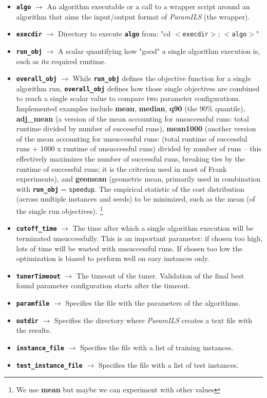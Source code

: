 \begin{itemize}
	\item \textbf{\texttt{algo}} $\rightarrow$ An algorithm executable or a call to a wrapper script around an algorithm that aims the input/output format of \textit{ParamILS} (the wrapper).
	\item \textbf{\texttt{execdir}} $\rightarrow$ Directory to execute \textbf{\texttt{algo}} from: "cd $<$\texttt{execdir}$>$; $<$\texttt{algo}$>$" 
	\item \textbf{\texttt{run\_obj}} $\rightarrow$ A scalar quantifying how "good" a single algorithm execution is, such as its required runtime.
	\item \textbf{\texttt{overall\_obj}} $\rightarrow$ While \textbf{\texttt{run\_obj}} defines the objective function for a single algorithm run, \textbf{\texttt{overall\_obj}} defines how those single objectives are combined to reach a single scalar value to compare two parameter configurations. Implemented examples include {\bf mean}, {\bf median}, {\bf q90} (the 90\% quantile), {\bf adj\_mean} (a version of the mean accounting for unsuccessful runs: total runtime divided by number of successful runs), {\bf mean1000} (another version of the mean accounting for unsuccessful runs: (total runtime of successful runs + 1000 x runtime of unsuccessful runs) divided by number of runs -- this effectively maximizes the number of successful runs, breaking ties by the runtime of successful runs; it is the criterion used in most of Frank experiments), and {\bf geomean} (geometric mean, primarily used in combination with \textbf{\texttt{run\_obj}} = \texttt{speedup}. The empirical statistic of the cost distribution (across multiple instances and seeds) to be minimized, such as the mean (of the single run objectives). \footnote{We use {\bf mean} but maybe we can experiment with other values}
	\item \textbf{\texttt{cutoff\_time}} $\rightarrow$ The time after which a single algorithm execution will be terminated unsuccessfully. This is an important parameter: if chosen too high, lots of time will be wasted with unsuccessful runs. If chosen too low the optimization is biased to perform well on easy instances only.
	\item \textbf{\texttt{tunerTimeout}} $\rightarrow$ The timeout of the tuner. Validation of the final best found parameter configuration starts after the timeout.
	\item \textbf{\texttt{paramfile}} $\rightarrow$ Specifies the file with the parameters of the algorithms. 
	\item \textbf{\texttt{outdir}} $\rightarrow$ Specifies the directory where \textit{ParamILS} creates a text file with the results.
	\item \textbf{\texttt{instance\_file}} $\rightarrow$ Specifies the file with a list of training instances. 
	\item \textbf{\texttt{test\_instance\_file}} $\rightarrow$ Specifies the file with a list of test instances.
\end{itemize}

